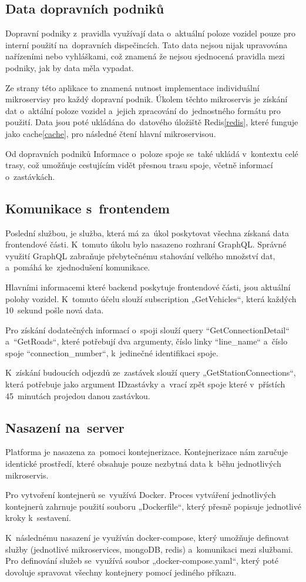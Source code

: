 \subsection {Data dopravních podniků}
Dopravní podniky z~pravidla využívají data o~aktuální poloze vozidel pouze pro interní použití na~dopravních dispečincích. Tato data nejsou nijak upravována nařízeními nebo vyhláškami, což znamená že nejsou sjednocená pravidla mezi podniky, jak by data měla vypadat.\par Ze strany této aplikace to znamená nutnost implementace individuální mikroservisy pro každý dopravní podnik. Úkolem těchto mikroservis je získání dat o~aktální poloze vozidel a~jejich zpracování do~jednostného formátu pro použití. Data jsou poté ukládána do~datového úložiště Redis\ref{redis}, které funguje jako cache\ref{cache}, pro následné čtení hlavní mikroservisou.\par Od dopravních podniků Informace o~poloze spoje se~také ukládá v~kontextu celé trasy, což umožňuje cestujícím vidět přesnou trasu spoje, včetně informací o~zastávkách.
\subsection {Komunikace s~frontendem}\label{mainBackend}
Poslední službou, je služba, která má za~úkol poskytovat všechna získaná data frontendové části. K~tomuto úkolu bylo nasazeno rozhraní GraphQL. Správné využití GraphQL zabraňuje přebytečnému stahování velkého množství dat, a~pomáhá ke~zjednodušení komunikace.\par Hlavními informacemi které backend poskytuje frontendové části, jsou aktuální polohy vozidel. K~tomuto účelu slouží subscription „GetVehicles“, která každých 10~sekund pošle nová data.\par Pro získání dodatečných informací o~spoji slouží query “\mbox{GetConnectionDetail}“ \newline a~“\mbox{GetRoads}“, které potřebují dva argumenty, číslo linky “\mbox{line\_name}“ \newline a~číslo spoje “\mbox{connection\_number}“, k~jedinečné identifikaci spoje.\par K~získání budoucích odjezdů ze~zastávek slouží query „GetStationConnections“, která potřebuje jako argument IDzastávky a~vrací zpět spoje které v~přístích 45~minutách projedou danou zastávkou.
\subsection{Nasazení na~server}
Platforma je nasazena za~pomoci kontejnerizace. Kontejnerizace nám zaručuje identické prostředí, které obsahuje pouze nezbytná data k~běhu jednotlivých mikroservis.\par Pro vytvoření kontejnerů se~využívá Docker. Proces vytváření jednotlivých kontejnerů zahrnuje použití souboru „Dockerfile“, který přesně popisuje jednotlivé kroky k~sestavení.\par K~následnému nasazení je využíván docker-compose, který umožňuje definovat služby (jednotlivé mikroservices, mongoDB, redis) a~komunikaci mezi službami. Pro definování služeb se~využívá soubor „docker-compose.yaml“, který poté dovoluje spravovat všechny kontejnery pomocí jediného příkazu.